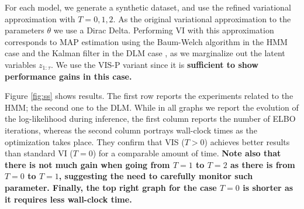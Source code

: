  For each model, we generate a synthetic dataset, and use the refined variational approximation with $T = 0, 1, 2$. As the original variational approximation to the parameters $\theta$ we use a Dirac Delta. Performing VI with this approximation corresponds to MAP estimation using 
 the Baum-Welch algorithm in the HMM case \cite{rabiner1989tutorial} and
 the Kalman filter in the DLM case \cite{zarchan2013fundamentals},
  as we marginalize out the latent variables $z_{1:\tau}$. We use the VIS-P variant since it is {\bf sufficient  to show performance gains in this case.}%
 
 Figure \ref{fig:ss} shows results. The first row reports the experiments related to the HMM; the second one to the DLM. While in all graphs we report the evolution of the log-likelihood during inference, the first column reports the number of ELBO iterations, whereas the second column portrays 
 wall-clock times as the optimization takes place. They confirm that VIS ($T>0$) achieves better results than standard VI ($T=0$) for a comparable amount of time. {\bf Note also  that there is not much gain when going from $T=1$ to $T=2$ as there is from $T=0$ to $T=1$, suggesting the need to carefully 
 monitor such parameter. Finally, the top right graph for the case $T=0$ is shorter as it requires less wall-clock time.}

